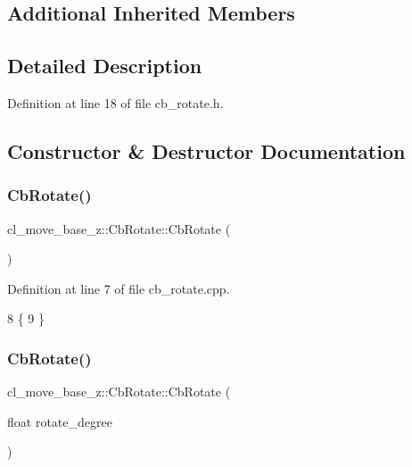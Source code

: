 \subsection*{Additional Inherited Members}


\subsection{Detailed Description}


Definition at line 18 of file cb\+\_\+rotate.\+h.



\subsection{Constructor \& Destructor Documentation}
\mbox{\label{classcl__move__base__z_1_1CbRotate_a00dc68fbc8e72461f338de1cbdfceffd}} 
\subsubsection{\texorpdfstring{Cb\+Rotate()}{CbRotate()}\hspace{0.1cm}{\footnotesize\ttfamily [1/2]}}
{\footnotesize\ttfamily cl\+\_\+move\+\_\+base\+\_\+z\+::\+Cb\+Rotate\+::\+Cb\+Rotate (\begin{DoxyParamCaption}{ }\end{DoxyParamCaption})}



Definition at line 7 of file cb\+\_\+rotate.\+cpp.


\begin{DoxyCode}
8 \{
9 \}
\end{DoxyCode}
\mbox{\label{classcl__move__base__z_1_1CbRotate_ac5b1f8c358d719d2cdc8417f65143ad8}} 
\subsubsection{\texorpdfstring{Cb\+Rotate()}{CbRotate()}\hspace{0.1cm}{\footnotesize\ttfamily [2/2]}}
{\footnotesize\ttfamily cl\+\_\+move\+\_\+base\+\_\+z\+::\+Cb\+Rotate\+::\+Cb\+Rotate (\begin{DoxyParamCaption}\item[{float}]{rotate\+\_\+degree }\end{DoxyParamCaption})}



